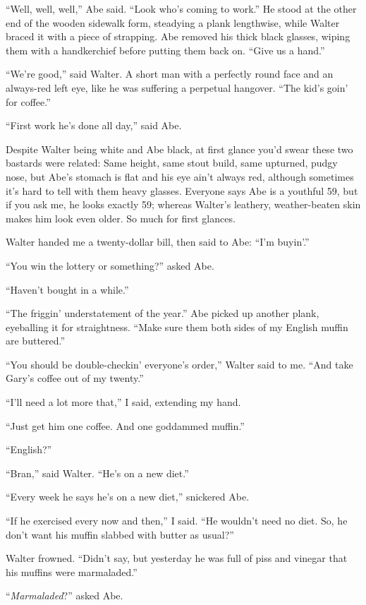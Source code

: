 ``Well, well, well,'' Abe said. ``Look who's coming to work.'' He stood
at the other end of the wooden sidewalk form, steadying a plank
lengthwise, while Walter braced it with a piece of strapping. Abe
removed his thick black glasses, wiping them with a handkerchief before
putting them back on. ``Give us a hand.'' ~

``We're good,'' said Walter. A short man with a perfectly round face and
an always-red left eye, like he was suffering a perpetual hangover.
``The kid's goin' for coffee.''

``First work he's done all day,'' said Abe.

Despite Walter being white and Abe black, at first glance you'd swear
these two bastards were related: Same height, same stout build, same
upturned, pudgy nose, but Abe's stomach is flat and his eye ain't always
red, although sometimes it's hard to tell with them heavy glasses.
Everyone says Abe is a youthful 59, but if you ask me, he looks exactly
59; whereas Walter's leathery, weather-beaten skin makes him look even
older. So much for first glances.

Walter handed me a twenty-dollar bill, then said to Abe: ``I'm buyin'.''
~~

``You win the lottery or something?'' asked Abe.

``Haven't bought in a while.''

``The friggin' understatement of the year.'' Abe picked up another
plank, eyeballing it for straightness. ``Make sure them both sides of my
English muffin are buttered.''

``You should be double-checkin' everyone's order,'' Walter said to me.
``And take Gary's coffee out of my twenty.''

``I'll need a lot more that,'' I said, extending my hand.

``Just get him one coffee. And one goddammed muffin.''

``English?''

``Bran,'' said Walter. ``He's on a new diet.''

``Every week he says he's on a new diet,'' snickered Abe. ~~~

``If he exercised every now and then,'' I said. ``He wouldn't need no
diet. So, he don't want his muffin slabbed with butter as usual?''

Walter frowned. ``Didn't say, but yesterday he was full of piss and
vinegar that his muffins were marmaladed.''

``\emph{Marmaladed}?'' asked Abe.

